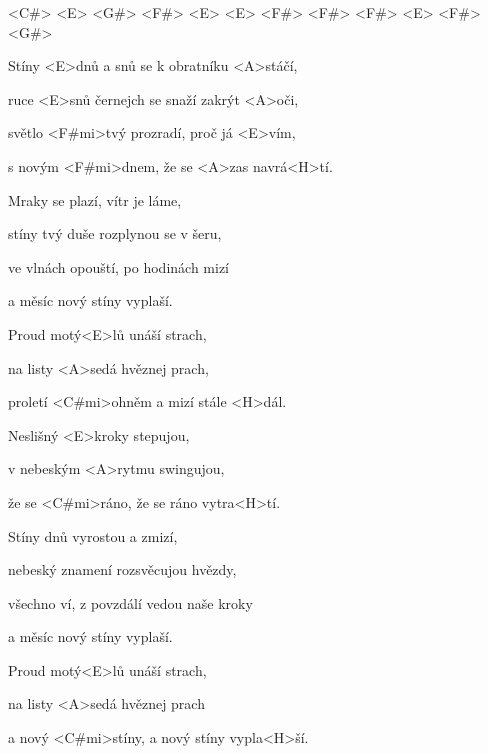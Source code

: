 

<C#> <E> <G#> <F#> <E> <E> <F#> <F#> <F#> <E> <F#> <G#>

\zs
Stíny <E>dnů a snů se k obratníku <A>stáčí,

ruce <E>snů černejch se snaží zakrýt <A>oči,

světlo <F#mi>tvý prozradí, proč já <E>vím,

s novým <F#mi>dnem, že se <A>zas navrá<H>tí.
\ks

\zs
Mraky se plazí, vítr je láme,

stíny tvý duše rozplynou se v šeru,

ve vlnách opouští, po hodinách mizí

a měsíc nový stíny vyplaší.
\ks

\zr
Proud motý<E>lů unáší strach,

na listy <A>sedá hvěznej prach,

proletí <C#mi>ohněm a mizí stále <H>dál.

Neslišný <E>kroky stepujou,

v nebeským <A>rytmu swingujou,

že se <C#mi>ráno, že se ráno vytra<H>tí.
\kr

\zs
Stíny dnů vyrostou a zmizí,

nebeský znamení rozsvěcujou hvězdy,

všechno ví, z povzdálí vedou naše kroky

a měsíc nový stíny vyplaší.
\ks

\zr \kr

\zr
Proud motý<E>lů unáší strach,

na listy <A>sedá hvěznej prach

a nový <C#mi>stíny, a nový stíny vypla<H>ší.
\kr

\kp





